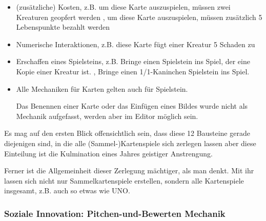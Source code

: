 \documentclass[fontsize=12]{scrartcl}
\begin{document}
\begin{itemize}
		\item (zusätzliche) Kosten, z.B. \glqq um diese Karte auszuspielen, müssen zwei Kreaturen geopfert werden \grqq, \glqq um diese Karte auszuspielen, müssen zusätzlich 5 Lebenspunkte bezahlt werden \grqq
		
		\item Numerische Interaktionen, z.B. \glqq diese Karte fügt einer Kreatur 5 Schaden zu \grqq
		
		\item Erschaffen eines Spielsteins, z.B. \glqq Bringe einen Spielstein ins Spiel, der eine Kopie einer Kreatur ist. \grqq, \glqq Bringe einen 1/1-Kaninchen Spielstein ins Spiel. \grqq
		
		\item Alle Mechaniken für Karten gelten auch für Spielstein.
		
		Das Benennen einer Karte oder das Einfügen eines Bildes wurde nicht als Mechanik aufgefasst, werden aber im Editor möglich sein.\hfill\newline
		
	\end{itemize}
	
	\noindent Es mag auf den ersten Blick offensichtlich sein, dass diese 12 Bausteine gerade diejenigen sind, in die alle (Sammel-)Kartenspiele sich zerlegen lassen aber diese Einteilung ist die Kulmination eines Jahres geistiger Anstrengung.\hfill\newline
	
	\noindent Ferner ist die Allgemeinheit dieser Zerlegung mächtiger, als man denkt. Mit ihr lassen sich nicht nur Sammelkartenspiele erstellen, sondern alle Kartenspiele insgesamt, z.B. auch so etwas wie UNO.
	
	\subsubsection{Soziale Innovation: Pitchen-und-Bewerten Mechanik}
	
\end{document}
